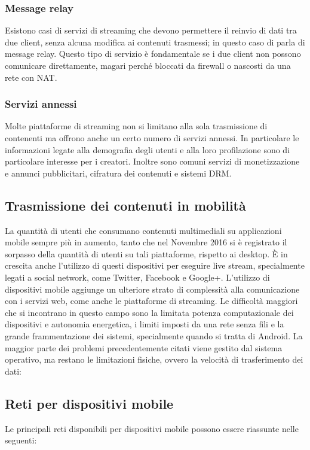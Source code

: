 		\subsubsection{Message relay}
			Esistono casi di servizi di streaming che devono permettere il reinvio di dati tra due client, senza alcuna modifica ai contenuti trasmessi; in questo caso di parla di message relay. Questo tipo di servizio è fondamentale se i due client non possono comunicare direttamente, magari perché bloccati da firewall o nascosti da una rete con NAT.\@

		\subsubsection{Servizi annessi}
			Molte piattaforme di streaming non si limitano alla sola trasmissione di contenenti ma offrono anche un certo numero di servizi annessi. In particolare le informazioni legate alla demografia degli utenti e alla loro profilazione sono di particolare interesse per i creatori. Inoltre sono comuni servizi di monetizzazione e annunci pubblicitari, cifratura dei contenuti e sistemi DRM.\@


	\subsection{Trasmissione dei contenuti in mobilità}
			La quantità di utenti che consumano contenuti multimediali su applicazioni mobile sempre più in aumento, tanto che nel Novembre 2016 si è registrato il sorpasso della quantità di utenti su tali piattaforme, rispetto ai desktop. È in crescita anche l'utilizzo di questi dispositivi per eseguire live stream, specialmente legati a social network, come Twitter, Facebook e Google+.
			L'utilizzo di dispositivi mobile aggiunge un ulteriore strato di complessità alla comunicazione con i servizi web, come anche le piattaforme di streaming.
			Le difficoltà maggiori che si incontrano in questo campo sono la limitata potenza computazionale dei dispositivi e autonomia energetica, i limiti imposti da una rete senza fili e la grande frammentazione dei sistemi, specialmente quando si tratta di Android.
			La maggior parte dei problemi precedentemente citati viene gestito dal sistema operativo, ma restano le limitazioni fisiche, ovvero la velocità di trasferimento dei dati:
	\subsection{Reti per dispositivi mobile}
			Le principali reti disponibili per dispositivi mobile possono essere riassunte nelle seguenti:

